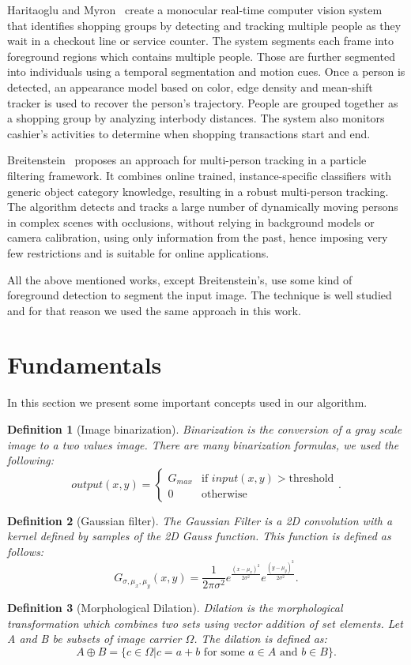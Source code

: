 \documentclass[10pt, conference]{IEEEtran}
\newtheorem{definition}{Definition}
\begin{document}
	Haritaoglu and Myron~\cite{haritaoglu2001detection} create a monocular real-time computer vision system that identifies shopping groups by detecting and tracking multiple people as they wait in a checkout line or service counter. The system segments each frame into foreground regions which contains multiple people. Those are further segmented into individuals using a temporal segmentation and motion cues. Once a person is detected, an appearance model based on color, edge density and mean-shift tracker is used to recover the person’s trajectory. People are grouped together as a shopping group by analyzing interbody distances. The system also monitors cashier’s activities to determine when shopping transactions start and end.
	
	Breitenstein~\cite{breitenstein2011online} proposes an approach for multi-person tracking in a particle filtering framework. It combines online trained, instance-specific classifiers with generic object category knowledge, resulting in a robust multi-person tracking. The algorithm detects and tracks a large number of dynamically moving persons in complex scenes with occlusions, without relying in background models or camera calibration, using only information from the past, hence imposing very few restrictions and is suitable for online applications.
	
	All the above mentioned works, except Breitenstein's, use some kind of foreground detection to segment the input image. The technique is well studied and for that reason we used the same approach in this work.
	
	\section{Fundamentals}
	In this section we present some important concepts used in our algorithm.
	\begin{definition}[Image binarization]
		Binarization is the conversion of a gray scale image to a two values image. There are many binarization formulas, we used the following:
		\[
		output(x,y) =
		\begin{cases}
		G_{max} & \text{if } input(x,y) > \text{threshold}\\
		0 & \text{otherwise}
		\end{cases}.
		\]
	\end{definition}
	\begin{definition}[Gaussian filter]
		The Gaussian Filter is a 2D convolution with a kernel defined by samples of the 2D Gauss function. This function is defined as follows:
		$$ G_{\sigma,\mu_{x},\mu_{y}}(x,y)=\frac{1}{2\pi\sigma^{2}}
		e^{\frac{(x-\mu_{x})^{2}}{2\sigma^{2}}}
		e^{\frac{(y-\mu_{y})^{2}}{2\sigma^{2}}}.$$
		
	\end{definition}
	\begin{definition}[Morphological Dilation]
		Dilation is the morphological transformation which combines two sets using vector addition of set elements. Let A and B be subsets of image carrier $\Omega$. The dilation is defined as: $$A \oplus B=\{c\in\Omega|c=a+b \text{ for some }a\in A\text{  and }b \in B\}.$$
	\end{definition}
	
\end{document}

